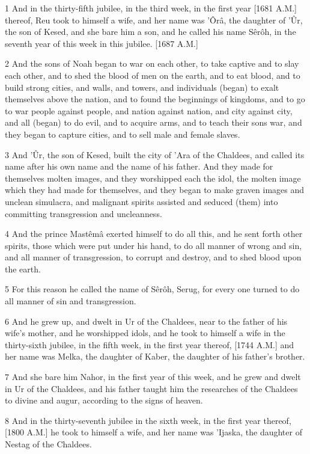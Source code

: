 \par 1 And in the thirty-fifth jubilee, in the third week, in the first year [1681 A.M.] thereof, Reu took to himself a wife, and her name was 'Ôrâ, the daughter of 'Ûr, the son of Kesed, and she bare him a son, and he called his name Sêrôh, in the seventh year of this week in this jubilee. [1687 A.M.]
\par 2 And the sons of Noah began to war on each other, to take captive and to slay each other, and to shed the blood of men on the earth, and to eat blood, and to build strong cities, and walls, and towers, and individuals (began) to exalt themselves above the nation, and to found the beginnings of kingdoms, and to go to war people against people, and nation against nation, and city against city, and all (began) to do evil, and to acquire arms, and to teach their sons war, and they began to capture cities, and to sell male and female slaves.
\par 3 And 'Ûr, the son of Kesed, built the city of 'Ara of the Chaldees, and called its name after his own name and the name of his father. And they made for themselves molten images, and they worshipped each the idol, the molten image which they had made for themselves, and they began to make graven images and unclean simulacra, and malignant spirits assisted and seduced (them) into committing transgression and uncleanness.
\par 4 And the prince Mastêmâ exerted himself to do all this, and he sent forth other spirits, those which were put under his hand, to do all manner of wrong and sin, and all manner of transgression, to corrupt and destroy, and to shed blood upon the earth.
\par 5 For this reason he called the name of Sêrôh, Serug, for every one turned to do all manner of sin and transgression.
\par 6 And he grew up, and dwelt in Ur of the Chaldees, near to the father of his wife's mother, and he worshipped idols, and he took to himself a wife in the thirty-sixth jubilee, in the fifth week, in the first year thereof, [1744 A.M.] and her name was Melka, the daughter of Kaber, the daughter of his father's brother.
\par 7 And she bare him Nahor, in the first year of this week, and he grew and dwelt in Ur of the Chaldees, and his father taught him the researches of the Chaldees to divine and augur, according to the signs of heaven.
\par 8 And in the thirty-seventh jubilee in the sixth week, in the first year thereof, [1800 A.M.] he took to himself a wife, and her name was 'Ijaska, the daughter of Nestag of the Chaldees.

